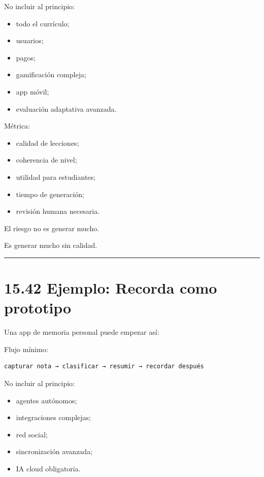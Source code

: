 No incluir al principio:

\begin{itemize}
\tightlist
\item
  todo el currículo;
\item
  usuarios;
\item
  pagos;
\item
  gamificación compleja;
\item
  app móvil;
\item
  evaluación adaptativa avanzada.
\end{itemize}

Métrica:

\begin{itemize}
\tightlist
\item
  calidad de lecciones;
\item
  coherencia de nivel;
\item
  utilidad para estudiantes;
\item
  tiempo de generación;
\item
  revisión humana necesaria.
\end{itemize}

El riesgo no es generar mucho.

Es generar mucho sin calidad.

\begin{center}\rule{0.5\linewidth}{0.5pt}\end{center}

\section{15.42 Ejemplo: Recorda como
prototipo}\label{ejemplo-recorda-como-prototipo}

Una app de memoria personal puede empezar así:

Flujo mínimo:

\begin{lstlisting}
capturar nota → clasificar → resumir → recordar después
\end{lstlisting}

No incluir al principio:

\begin{itemize}
\tightlist
\item
  agentes autónomos;
\item
  integraciones complejas;
\item
  red social;
\item
  sincronización avanzada;
\item
  IA cloud obligatoria.
\end{itemize}

